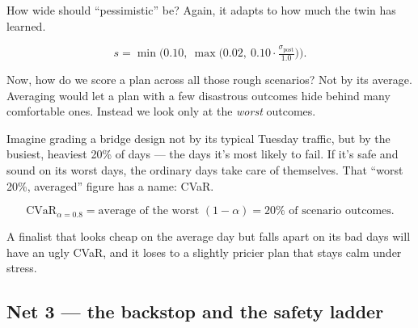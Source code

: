 How wide should ``pessimistic'' be? Again, it adapts to how much the twin has learned.

\begin{equation}\label{eq:ensemble}
s = \min\!\Big(0.10,\ \max\big(0.02,\ 0.10\cdot \tfrac{\sigma_{\text{post}}}{1.0}\big)\Big).
\end{equation}

Now, how do we score a plan across all those rough scenarios? Not by its average. Averaging would let a plan with a few disastrous outcomes hide behind many comfortable ones. Instead we look only at the \emph{worst} outcomes.

\begin{analogy}
Imagine grading a bridge design not by its typical Tuesday traffic, but by the busiest, heaviest 20\% of days --- the days it's most likely to fail. If it's safe and sound on its worst days, the ordinary days take care of themselves. That ``worst 20\%, averaged'' figure has a name: CVaR.
\end{analogy}

\begin{equation}\label{eq:cvar}
\text{CVaR}_{\alpha=0.8} = \text{average of the worst } (1-\alpha) = 20\% \text{ of scenario outcomes.}
\end{equation}

A finalist that looks cheap on the average day but falls apart on its bad days will have an ugly CVaR, and it loses to a slightly pricier plan that stays calm under stress.

\subsection{Net 3 --- the backstop and the safety ladder}


